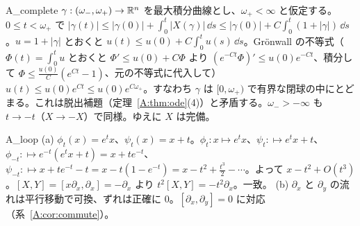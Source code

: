 \begin{soll}{A_complete}
$\gamma:(\omega_-,\omega_+)\to\mathbb R^n$ を最大積分曲線とし、$\omega_+<\infty$ と仮定する。$0\le t<\omega_+$ で $|\gamma(t)|\le|\gamma(0)|+\int_0^t|X(\gamma)|\,\dd s\le|\gamma(0)|+C\int_0^t(1+|\gamma|)\,\dd s$。$u=1+|\gamma|$ とおくと $u(t)\le u(0)+C\int_0^tu(s)\,\dd s$。Grönwall の不等式（$\Phi(t)=\int_0^tu$ とおくと $\Phi'\le u(0)+C\Phi$ より $(e^{-Ct}\Phi)'\le u(0)e^{-Ct}$、積分して $\Phi\le\frac{u(0)}C(e^{Ct}-1)$、元の不等式に代入して）$u(t)\le u(0)e^{Ct}\le u(0)e^{C\omega_+}$。すなわち $\gamma$ は $[0,\omega_+)$ で有界な閉球の中にとどまる。これは脱出補題（定理~\ref{A:thm:ode}(4)）と矛盾する。$\omega_->-\infty$ も $t\to-t$（$X\to-X$）で同様。ゆえに $X$ は完備。
\end{soll}



\begin{soll}{A_loop}
(a) $\phi_t(x)=e^tx$、$\psi_t(x)=x+t$。$\phi_t:x\mapsto e^tx$、$\psi_t:\mapsto e^tx+t$、$\phi_{-t}:\mapsto e^{-t}(e^tx+t)=x+te^{-t}$、$\psi_{-t}:\mapsto x+te^{-t}-t=x-t(1-e^{-t})=x-t^2+\frac{t^3}2-\cdots$。よって $x-t^2+O(t^3)$。$[X,Y]=[x\partial_x,\partial_x]=-\partial_x$ より $t^2[X,Y]=-t^2\partial_x$。一致。
(b) $\partial_x$ と $\partial_y$ の流れは平行移動で可換、ずれは正確に $0$。$[\partial_x,\partial_y]=0$ に対応（系~\ref{A:cor:commute}）。
\end{soll}


